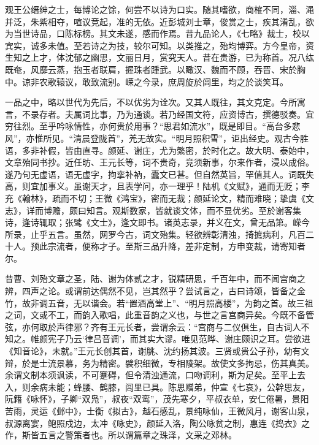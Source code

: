 观王公缙绅之士，每博论之馀，何尝不以诗为口实。随其嗜欲，商榷不同，淄、渑并泛，朱紫相夺，喧议竞起，准的无依。近彭城刘士章，俊赏之士，疾其淆乱，欲为当世诗品，口陈标榜。其文未遂，感而作焉。昔九品论人，《七略》裁士，校以宾实，诚多未值。至若诗之为技，较尔可知。以类推之，殆均博弈。方今皇帝，资生知之上才，体沈郁之幽思，文丽日月，赏究天人。昔在贵游，已为称首。况八纮既奄，风靡云蒸，抱玉者联肩，握珠者踵武。以瞰汉、魏而不顾，吞晋、宋於胸中。谅非农歌辕议，敢致流别。嵘之今录，庶周旋於闾里，均之於谈笑耳。

一品之中，略以世代为先后，不以优劣为诠次。又其人既往，其文克定。今所寓言，不录存者。夫属词比事，乃为通谈。若乃经国文符，应资博古，撰德驳奏。宜穷往烈。至乎吟咏情性，亦何贵於用事？“思君如流水”，既是即目。“高台多悲风”，亦惟所见。“清晨登陇首”，羌无故实。“明月照积雪”，讵出经史。观古今胜语，多非补假，皆由直寻。颜延、谢庄，尤为繁密，於时化之。故大明、泰始中，文章殆同书抄。近任昉、王元长等，词不贵奇，竞须新事，尔来作者，浸以成俗。遂乃句无虚语，语无虚字，拘挛补衲，蠹文已甚。但自然英旨，罕值其人。词既失高，则宜加事义。虽谢天才，且表学问，亦一理乎！陆机《文赋》，通而无贬；李充《翰林》，疏而不切；王微《鸿宝》，密而无裁；颜延论文，精而难晓；挚虞《文志》，详而博赡，颇曰知言。观斯数家，皆就谈文体，而不显优劣。至於谢客集诗，逢诗辄取；张骘《文士》，逢文即书。诸英志录，并义在文，曾无品第。嵘今所录，止乎五言。虽然，网罗今古，词文殆集。轻欲辨彰清浊，掎摭病利，凡百二十人。预此宗流者，便称才子。至斯三品升降，差非定制，方申变裁，请寄知者尔。

昔曹、刘殆文章之圣，陆、谢为体贰之才，锐精研思，千百年中，而不闻宫商之辨，四声之论。或谓前达偶然不见，岂其然乎？尝试言之，古曰诗颂，皆备之金竹，故非调五音，无以谐会。若“置酒高堂上”、“明月照高楼”，为韵之首。故三祖之词，文或不工，而韵入歌唱，此重音韵之义也，与世之言宫商异矣。今既不备管弦，亦何取於声律邪？齐有王元长者，尝谓余云：“宫商与二仪俱生，自古词人不知之。帷颜宪子乃云‘律吕音调’，而其实大谬。唯见范晔、谢庄颇识之耳。尝欲进《知音论》，未就。”王元长创其首，谢朓、沈约扬其波。三贤或贵公子孙，幼有文辩，於是士流景慕，务为精密。襞积细微，专相陵架。故使文多拘忌，伤其真美。余谓文制本须讽读，不可蹇碍，但令清浊通流，口吻调利，斯为足矣。至平上去入，则余病未能；蜂腰、鹤膝，闾里已具。陈思赠弟，仲宣《七哀》，公幹思友，阮籍《咏怀》，子卿“双凫”，叔夜“双鸾”，茂先寒夕，平叔衣单，安仁倦暑，景阳苦雨，灵运《邺中》，士衡《拟古》，越石感乱，景纯咏仙，王微风月，谢客山泉，叔源离宴，鲍照戍边，太冲《咏史》，颜延入洛，陶公咏贫之制，惠连《捣衣》之作，斯皆五言之警策者也。所以谓篇章之珠泽，文采之邓林。